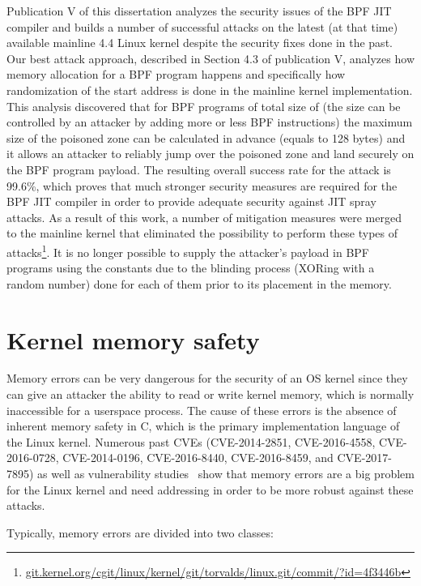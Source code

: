 Publication V of this dissertation analyzes the security issues of the BPF JIT compiler and builds a number of successful attacks on the latest (at that time) available mainline 4.4 Linux kernel despite the security fixes done in the past. 
Our best attack approach, described in Section 4.3 of publication V, analyzes how memory allocation for a BPF program happens and specifically how randomization of the start address is done in the mainline kernel implementation. 
This analysis discovered that for BPF programs of total size of  (the size can be controlled by an attacker by adding more or less BPF instructions) the maximum size of the poisoned zone can be calculated in advance (equals to 128 bytes) and it allows an attacker to reliably jump over the poisoned zone and land securely on the BPF program payload. The resulting overall success rate for the attack is 99.6\%, which proves that much stronger security measures are required for the BPF JIT compiler in order to provide adequate security against JIT spray attacks. As a result of this work, a number of mitigation measures were merged to the mainline kernel that eliminated the possibility to perform these types of attacks\footnote{\url{git.kernel.org/cgit/linux/kernel/git/torvalds/linux.git/commit/?id=4f3446b}}. It is no longer possible to supply the attacker's payload in BPF programs using the constants due to the blinding process (XORing with a random number) done for each of them prior to its placement in the memory.

\section{Kernel memory safety}
\label{sec:kern-mem-safety}

Memory errors can be very dangerous for the security of an OS kernel since they can give an attacker the ability to read or write kernel memory, which is normally inaccessible for a userspace process. The cause of these errors is the absence of inherent memory safety in C, which is the primary implementation language of the Linux kernel. 
Numerous past CVEs (CVE-2014-2851, CVE-2016-4558, CVE-2016-0728, CVE-2014-0196, CVE-2016-8440, CVE-2016-8459, and CVE-2017-7895) as well as vulnerability studies~\cite{raheja2016analysis, chen2011linux} show that memory errors are a big problem for the Linux kernel and need addressing in order to be more robust against these attacks.

Typically, memory errors are divided into two classes:

